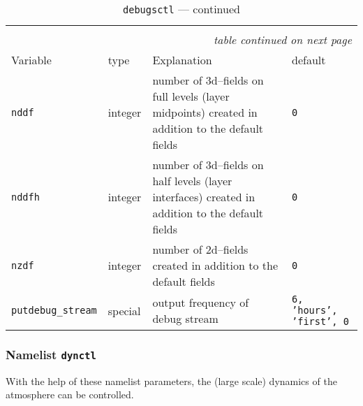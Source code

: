\begin{longtable}{l@{\extracolsep\fill}lp{5.0cm}p{3.0cm}}
\hline\hline\caption[Namelist {\tt debugsctl}]{Namelist
  {\tt debugsctl}}\\\hline\label{tabdebugsctl}
\endfirsthead
\caption[]{{\tt debugsctl} --- continued}\\\hline
\endhead
\hline\multicolumn{4}{r}{\slshape table continued on next page}\\
\endfoot
\hline %
\endlastfoot
Variable & type & Explanation & default \\\hline
{\tt nddf}\index{namelist variables!nddf}
 & integer & number of 3d--fields  on full levels (layer midpoints) created in addition to the default
  fields & {\tt 0} \\
{\tt nddfh}\index{namelist variables!nddfh} & integer & number of
3d--fields on half levels (layer interfaces) created in addition to
the default fields & {\tt 0} \\
{\tt nzdf}\index{namelist variables!nzdf}
 & integer & number of 2d--fields created in addition to the default
  fields & {\tt 0} \\
{\tt putdebug\_stream}\index{namelist variables!putdebug\_stream}
 & special & output frequency of debug stream &
{\tt 6, 'hours', 'first', 0}\\
\hline 
\end{longtable}

\subsubsection{Namelist {\tt dynctl}}\label{secdynctl}

With the help of these namelist parameters, the (large
scale) dynamics of the atmosphere can be controlled.

\setlength{\LTcapwidth}{\textwidth}
\setlength{\LTleft}{0pt}\setlength{\LTright}{0pt}

